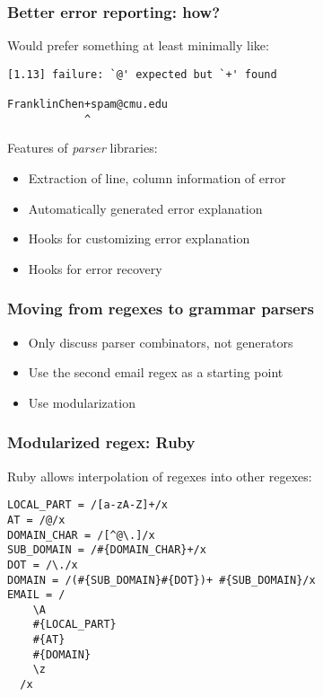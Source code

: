 \begin{frame}[fragile]
  \frametitle{Better error reporting: how?}

  Would prefer something at least minimally like:

  \begin{verbatim}
[1.13] failure: `@' expected but `+' found

FranklinChen+spam@cmu.edu
            ^
  \end{verbatim}

  Features of \emph{parser} libraries:
  \begin{itemize}
    \item Extraction of line, column information of error
    \item Automatically generated error explanation
    \item Hooks for customizing error explanation
    \item Hooks for error recovery
  \end{itemize}
\end{frame}

\begin{frame}
  \frametitle{Moving from regexes to grammar parsers}

  \begin{itemize}
    \item Only discuss parser combinators, not generators
    \item Use the second email regex as a starting point
    \item Use modularization
  \end{itemize}
\end{frame}

%


%
%


\begin{frame}[fragile]
  \frametitle{Modularized regex: Ruby}

  Ruby allows interpolation of regexes into other regexes:

  \begin{verbatim}
LOCAL_PART = /[a-zA-Z]+/x
AT = /@/x
DOMAIN_CHAR = /[^@\.]/x
SUB_DOMAIN = /#{DOMAIN_CHAR}+/x
DOT = /\./x
DOMAIN = /(#{SUB_DOMAIN}#{DOT})+ #{SUB_DOMAIN}/x
EMAIL = /
    \A
    #{LOCAL_PART}
    #{AT}
    #{DOMAIN}
    \z
  /x
  \end{verbatim}
\end{frame}

